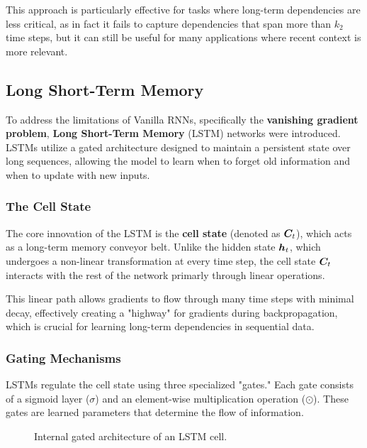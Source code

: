 This approach is particularly effective for tasks where long-term dependencies are less critical, as in fact
it fails to capture dependencies that span more than $k_2$ time steps, but it can still be useful for many applications where recent context is more relevant.

\subsection{Long Short-Term Memory}
To address the limitations of Vanilla RNNs, specifically the \textbf{vanishing gradient problem}, \textbf{Long Short-Term Memory} (LSTM)
networks were introduced. LSTMs utilize a gated architecture designed to maintain a persistent state over long sequences,
allowing the model to learn when to forget old information and when to update with new inputs.

\subsubsection{The Cell State}
The core innovation of the LSTM is the \textbf{cell state} (denoted as $\boldsymbol{C}_t$), which acts as a long-term memory conveyor belt.
Unlike the hidden state $\boldsymbol{h}_t$, which undergoes a non-linear transformation at every time step, the cell state $\boldsymbol{C}_t$
interacts with the rest of the network primarly through linear operations.

This linear path allows gradients to flow through many time steps with minimal decay,
effectively creating a "highway" for gradients during backpropagation, which is crucial for learning long-term dependencies in sequential data.

\subsubsection{Gating Mechanisms}
LSTMs regulate the cell state using three specialized "gates."
Each gate consists of a sigmoid layer ($\sigma$) and an element-wise multiplication operation ($\odot$).
These gates are learned parameters that determine the flow of information.

\begin{figure}[H]
    \centering
    \resizebox{.8\textwidth}{!}{
        
    }
    \caption{Internal gated architecture of an LSTM cell.}
\end{figure}

